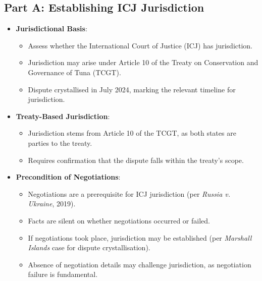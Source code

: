 \subsection{Part A: Establishing ICJ Jurisdiction}
\begin{itemize}
    \item \textbf{Jurisdictional Basis}:
    \begin{itemize}
        \item Assess whether the International Court of Justice (ICJ) has jurisdiction.
        \item Jurisdiction may arise under Article 10 of the Treaty on Conservation and Governance of Tuna (TCGT).
        \item Dispute crystallised in July 2024, marking the relevant timeline for jurisdiction.
    \end{itemize}
    \item \textbf{Treaty-Based Jurisdiction}:
    \begin{itemize}
        \item Jurisdiction stems from Article 10 of the TCGT, as both states are parties to the treaty.
        \item Requires confirmation that the dispute falls within the treaty's scope.
    \end{itemize}
    \item \textbf{Precondition of Negotiations}:
    \begin{itemize}
        \item Negotiations are a prerequisite for ICJ jurisdiction (per \textit{Russia v. Ukraine}, 2019).
        \item Facts are silent on whether negotiations occurred or failed.
        \item If negotiations took place, jurisdiction may be established (per \textit{Marshall Islands} case for dispute crystallisation).
        \item Absence of negotiation details may challenge jurisdiction, as negotiation failure is fundamental.
    \end{itemize}
\end{itemize}

